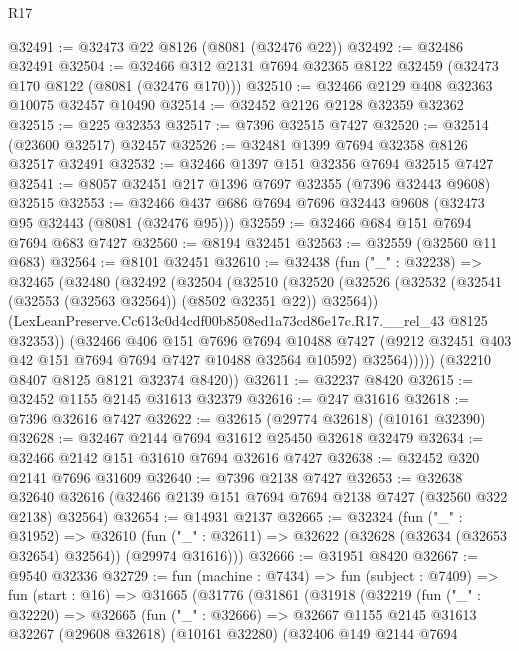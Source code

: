 \begin{lexlean}{R17}
\begin{coremodule}
@32491 := @32473 @22 @8126 (@8081 (@32476 @22))
@32492 := @32486 @32491
@32504 := @32466 @312 @2131 @7694 @32365 @8122 @32459 (@32473 @170 @8122 (@8081 (@32476 @170)))
@32510 := @32466 @2129 @408 @32363 @10075 @32457 @10490
@32514 := @32452 @2126 @2128 @32359 @32362
@32515 := @225 @32353
@32517 := @7396 @32515 @7427
@32520 := @32514 (@23600 @32517) @32457
@32526 := @32481 @1399 @7694 @32358 @8126 @32517 @32491
@32532 := @32466 @1397 @151 @32356 @7694 @32515 @7427
@32541 := @8057 @32451 @217 @1396 @7697 @32355 (@7396 @32443 @9608) @32515
@32553 := @32466 @437 @686 @7694 @7696 @32443 @9608 (@32473 @95 @32443 (@8081 (@32476 @95)))
@32559 := @32466 @684 @151 @7694 @7694 @683 @7427
@32560 := @8194 @32451
@32563 := @32559 (@32560 @11 @683)
@32564 := @8101 @32451
@32610 := @32438
    (fun ("_" : @32238) =>
    @32465
      (@32480
        (@32492
          (@32504
            (@32510
              (@32520
                (@32526 (@32532 (@32541 (@32553 (@32563 @32564)) (@8502 @32351 @22)) @32564))
                (LexLeanPreserve.Cc613c0d4cdf00b8508ed1a73cd86e17c.R17.__rel_43 @8125 @32353))
              (@32466
                @406
                @151
                @7696
                @7694
                @10488
                @7427
                (@9212 @32451 @403 @42 @151 @7694 @7694 @7427 @10488 @32564 @10592)
                @32564)))))
      (@32210 @8407 @8125 @8121 @32374 @8420))
@32611 := @32237 @8420
@32615 := @32452 @1155 @2145 @31613 @32379
@32616 := @247 @31616
@32618 := @7396 @32616 @7427
@32622 := @32615 (@29774 @32618) (@10161 @32390)
@32628 := @32467 @2144 @7694 @31612 @25450 @32618 @32479
@32634 := @32466 @2142 @151 @31610 @7694 @32616 @7427
@32638 := @32452 @320 @2141 @7696 @31609
@32640 := @7396 @2138 @7427
@32653 := @32638
    @32640
    @32616
    (@32466 @2139 @151 @7694 @7694 @2138 @7427 (@32560 @322 @2138) @32564)
@32654 := @14931 @2137
@32665 := @32324
    (fun ("_" : @31952) =>
    @32610 (fun ("_" : @32611) => @32622 (@32628 (@32634 (@32653 @32654) @32564)) (@29974 @31616)))
@32666 := @31951 @8420
@32667 := @9540 @32336
@32729 := fun (machine : @7434) =>
  fun (subject : @7409) =>
  fun (start : @16) =>
  @31665
    (@31776
      (@31861
        (@31918
          (@32219
            (fun ("_" : @32220) =>
            @32665
              (fun ("_" : @32666) =>
              @32667
                @1155
                @2145
                @31613
                @32267
                (@29608 @32618)
                (@10161 @32280)
                (@32406
                  @149
                  @2144
                  @7694

\end{coremodule}
\end{lexlean}
